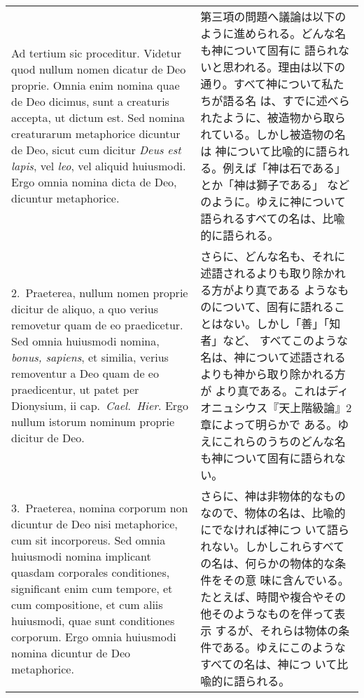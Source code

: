 \documentclass[10pt]{jsarticle}
\begin{document}
\begin{longtable}{p{21em}p{21em}}

{\sc Ad tertium sic proceditur}. Videtur quod nullum nomen dicatur de
Deo proprie. Omnia enim nomina quae de Deo dicimus, sunt a creaturis
accepta, ut dictum est. Sed nomina creaturarum metaphorice dicuntur de
Deo, sicut cum dicitur {\it Deus est lapis}, vel {\it leo}, vel
aliquid huiusmodi. Ergo omnia nomina dicta de Deo, dicuntur
metaphorice.

&

第三項の問題へ議論は以下のように進められる。どんな名も神について固有に
語られないと思われる。理由は以下の通り。すべて神について私たちが語る名
は、すでに述べられたように、被造物から取られている。しかし被造物の名は
神について比喩的に語られる。例えば「神は石である」とか「神は獅子である」
などのように。ゆえに神について語られるすべての名は、比喩的に語られる。

\\

2.~{\sc Praeterea}, nullum nomen proprie dicitur de aliquo, a quo
verius removetur quam de eo praedicetur. Sed omnia huiusmodi nomina,
{\it bonus, sapiens}, et similia, verius removentur a Deo quam de eo
praedicentur, ut patet per Dionysium, {\sc ii} cap.\ {\it Cael.\
Hier}. Ergo nullum istorum nominum proprie dicitur de Deo.

&

さらに、どんな名も、それに述語されるよりも取り除かれる方がより真である
ようなものについて、固有に語れることはない。しかし「善」「知者」など、
すべてこのような名は、神について述語されるよりも神から取り除かれる方が
より真である。これはディオニュシウス『天上階級論』2章によって明らかで
ある。ゆえにこれらのうちのどんな名も神について固有に語られない。

\\

3.~{\sc Praeterea}, nomina corporum non dicuntur de Deo nisi
metaphorice, cum sit incorporeus. Sed omnia huiusmodi nomina implicant
quasdam corporales conditiones, significant enim cum tempore, et cum
compositione, et cum aliis huiusmodi, quae sunt conditiones
corporum. Ergo omnia huiusmodi nomina dicuntur de Deo metaphorice.

&

さらに、神は非物体的なものなので、物体の名は、比喩的にでなければ神につ
いて語られない。しかしこれらすべての名は、何らかの物体的な条件をその意
味に含んでいる。たとえば、時間や複合やその他そのようなものを伴って表示
するが、それらは物体の条件である。ゆえにこのようなすべての名は、神につ
いて比喩的に語られる。


\end{longtable}
\end{document}
